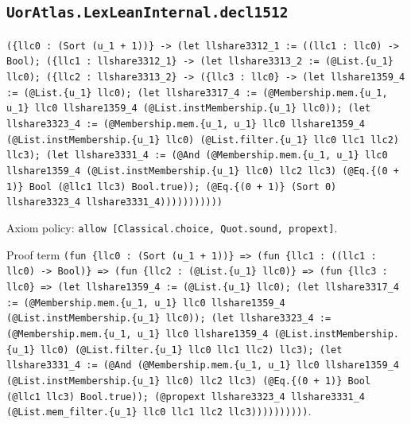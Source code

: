 \documentclass[11pt]{article}
\begin{document}
\subsection*{\texttt{UorAtlas.LexLeanInternal.decl1512}}
\noindent\texttt{(\{llc0 : (Sort (u\_1 + 1))\} -> (let llshare3312\_1 := ((llc1 : llc0) -> Bool); (\{llc1 : llshare3312\_1\} -> (let llshare3313\_2 := (@List.\{u\_1\} llc0); (\{llc2 : llshare3313\_2\} -> (\{llc3 : llc0\} -> (let llshare1359\_4 := (@List.\{u\_1\} llc0); (let llshare3317\_4 := (@Membership.mem.\{u\_1, u\_1\} llc0 llshare1359\_4 (@List.instMembership.\{u\_1\} llc0)); (let llshare3323\_4 := (@Membership.mem.\{u\_1, u\_1\} llc0 llshare1359\_4 (@List.instMembership.\{u\_1\} llc0) (@List.filter.\{u\_1\} llc0 llc1 llc2) llc3); (let llshare3331\_4 := (@And (@Membership.mem.\{u\_1, u\_1\} llc0 llshare1359\_4 (@List.instMembership.\{u\_1\} llc0) llc2 llc3) (@Eq.\{(0 + 1)\} Bool (@llc1 llc3) Bool.true)); (@Eq.\{(0 + 1)\} (Sort 0) llshare3323\_4 llshare3331\_4)))))))))))}\par
\noindent Axiom policy: \texttt{allow [Classical.choice, Quot.sound, propext]}.\par
\noindent Proof term \texttt{(fun \{llc0 : (Sort (u\_1 + 1))\} => (fun \{llc1 : ((llc1 : llc0) -> Bool)\} => (fun \{llc2 : (@List.\{u\_1\} llc0)\} => (fun \{llc3 : llc0\} => (let llshare1359\_4 := (@List.\{u\_1\} llc0); (let llshare3317\_4 := (@Membership.mem.\{u\_1, u\_1\} llc0 llshare1359\_4 (@List.instMembership.\{u\_1\} llc0)); (let llshare3323\_4 := (@Membership.mem.\{u\_1, u\_1\} llc0 llshare1359\_4 (@List.instMembership.\{u\_1\} llc0) (@List.filter.\{u\_1\} llc0 llc1 llc2) llc3); (let llshare3331\_4 := (@And (@Membership.mem.\{u\_1, u\_1\} llc0 llshare1359\_4 (@List.instMembership.\{u\_1\} llc0) llc2 llc3) (@Eq.\{(0 + 1)\} Bool (@llc1 llc3) Bool.true)); (@propext llshare3323\_4 llshare3331\_4 (@List.mem\_filter.\{u\_1\} llc0 llc1 llc2 llc3))))))))))}.\par
\end{document}
